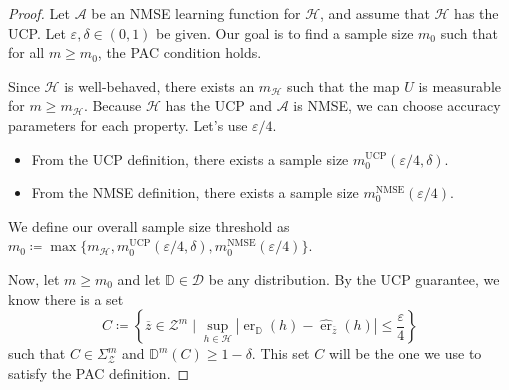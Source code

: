 \begin{proof}

    Let $\mathcal{A}$ be an NMSE learning function for $\mathcal{H}$, and assume that $\mathcal{H}$ has the UCP. Let $\varepsilon, \delta \in (0,1)$ be given. Our goal is to find a sample size $m_0$ such that for all $m \ge m_0$, the PAC condition holds.

    Since $\mathcal{H}$ is well-behaved, there exists an $m_{\mathcal{H}}$ such that the map $U$ is measurable for $m \ge m_{\mathcal{H}}$. Because $\mathcal{H}$ has the UCP and $\mathcal{A}$ is NMSE, we can choose accuracy parameters for each property. Let's use $\varepsilon/4$.
    \begin{itemize}
        \item From the UCP definition, there exists a sample size $m_0^{\text{UCP}}(\varepsilon/4, \delta)$.
        \item From the NMSE definition, there exists a sample size $m_0^{\text{NMSE}}(\varepsilon/4)$.
    \end{itemize}
    We define our overall sample size threshold as $m_0 \coloneqq \max\{m_{\mathcal{H}}, m_0^{\text{UCP}}(\varepsilon/4, \delta), m_0^{\text{NMSE}}(\varepsilon/4)\}$.

    Now, let $m \ge m_0$ and let $\mathbb{D} \in \mathcal{D}$ be any distribution. By the UCP guarantee, we know there is a set
    \[
        C \coloneqq \left\{ \overline{z} \in \mathcal{Z}^m \mid \sup_{h \in \mathcal{H}} |\operatorname{er}_{\mathbb{D}}(h) - \hat{\operatorname{er}}_{\overline{z}}(h)| \le \frac{\varepsilon}{4} \right\}
    \]
    such that $C \in \Sigma_{\mathcal{Z}}^m$ and $\mathbb{D}^m(C) \ge 1-\delta$. This set $C$ will be the one we use to satisfy the PAC definition.


\end{proof}
